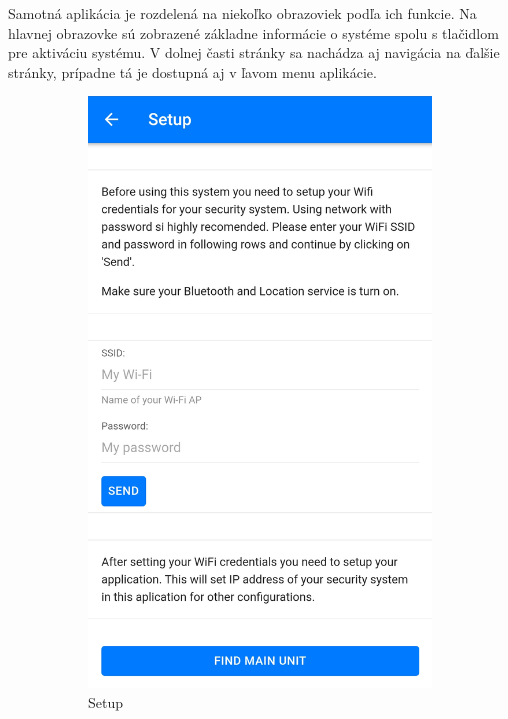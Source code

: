 Samotná aplikácia je rozdelená na niekoľko obrazoviek podľa ich funkcie. Na hlavnej obrazovke sú zobrazené základne informácie o systéme spolu s tlačidlom pre aktiváciu systému. V dolnej časti stránky sa nachádza aj navigácia na ďalšie stránky, prípadne tá je dostupná aj v ľavom menu aplikácie. 

\begin{figure}[!ht]
    \centering
    \begin{subfigure}{.4\textwidth}
      \centering
      \includegraphics[width=.8\linewidth]{obrazky-figures/screen_setup.jpg}  
      \caption{Setup}
      \label{fig:screen_setup}
    \end{subfigure}
    \begin{subfigure}{.4\textwidth}
      \centering

\end{subfigure}
\end{figure}
